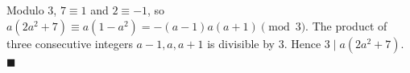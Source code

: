 Modulo $3$, $7\equiv1$ and $2\equiv-1$, so $a(2a^2+7)\equiv a(1-a^2)=-(a-1)a(a+1)\pmod3$. The product of three consecutive integers $a-1,a,a+1$ is divisible by $3$. Hence $3\mid a(2a^2+7)$. $\blacksquare$
